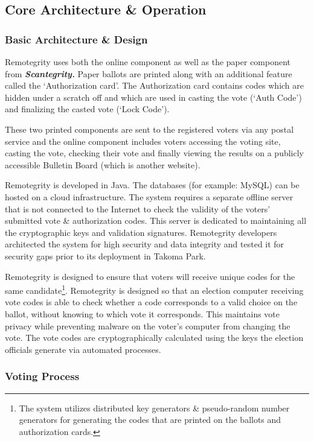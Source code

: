 \subsection{Core Architecture \& Operation}

\subsubsection{Basic Architecture \& Design}

Remotegrity uses both the online component as well as the paper component from \textbf{\textit{Scantegrity. }}Paper ballots are printed along with an additional feature called the `Authorization card'. The Authorization card contains codes which are hidden under a scratch off and which are used in casting the vote (`Auth Code') and finalizing the casted vote (`Lock Code').

These two printed components are sent to the registered voters via any postal service and the online component includes voters accessing the voting site, casting the vote, checking their vote and finally viewing the results on a publicly accessible Bulletin Board (which is another website).

Remotegrity is developed in Java. The databases (for example: MySQL) can be hosted on a cloud infrastructure. The system requires a separate offline server that is not connected to the Internet to check the validity of the voters' submitted vote \& authorization codes. This server is dedicated to maintaining all the cryptographic keys and validation signatures. Remotegrity developers architected the system for high security and data integrity and tested it for security gaps prior to its deployment in Takoma Park.

Remotegrity is designed to ensure that voters will receive unique codes for the same candidate\footnote{The system utilizes distributed key generators \& pseudo-random number generators for generating the codes that are printed on the ballots and authorization cards.}. Remotegrity is designed so that an election computer receiving vote codes is able to check whether a code corresponds to a valid choice on the ballot, without knowing to which vote it corresponds. This maintains vote privacy while preventing malware on the voter's computer from changing the vote. The vote codes are cryptographically calculated using the keys the election officials generate via automated processes.

\subsubsection{Voting Process}

